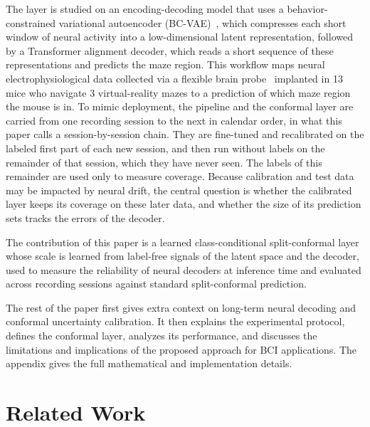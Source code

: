 \documentclass{article}
\begin{document}
The layer is studied on an encoding-decoding model that uses a behavior-constrained variational autoencoder (BC-VAE)~\cite{kingma2022a,pandarinath2018a}, which compresses each short window of neural activity into a low-dimensional latent representation, followed by a Transformer alignment decoder, which reads a short sequence of these representations and predicts the maze region. This workflow maps neural electrophysiological data collected via a flexible brain probe~\cite{tang2023a,zhao2024} implanted in 13 mice who navigate 3 virtual-reality mazes to a prediction of which maze region the mouse is in. To mimic deployment, the pipeline and the conformal layer are carried from one recording session to the next in calendar order, in what this paper calls a session-by-session chain. They are fine-tuned and recalibrated on the labeled first part of each new session, and then run without labels on the remainder of that session, which they have never seen. The labels of this remainder are used only to measure coverage. Because calibration and test data may be impacted by neural drift, the central question is whether the calibrated layer keeps its coverage on these later data, and whether the size of its prediction sets tracks the errors of the decoder.

The contribution of this paper is a learned class-conditional split-conformal layer whose scale is learned from label-free signals of the latent space and the decoder, used to measure the reliability of neural decoders at inference time and evaluated across recording sessions against standard split-conformal prediction.

The rest of the paper first gives extra context on long-term neural decoding and conformal uncertainty calibration. It then explains the experimental protocol, defines the conformal layer, analyzes its performance, and discusses the limitations and implications of the proposed approach for BCI applications. The appendix gives the full mathematical and implementation details.

\section{Related Work}
\end{document}
